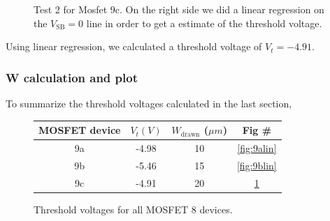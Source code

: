 \documentclass{article}
\begin{document}
\begin{figure}[H]
\centering
{}
\caption{Test 2 for Mosfet 9c. On the right side we did a linear regression on the $V_{\text{SB}} = 0$ line in order to get a estimate of the threshold voltage.}
\label{fig:9clin}
\end{figure}

Using linear regression, we calculated a threshold voltage of $V_t = -4.91$.

\subsubsection{W calculation and plot}
To summarize the threshold voltages calculated in the last section,
\begin{figure}[H]
\centering
\begin{tabular}{c || c | c | c }
MOSFET device & $V_t (V)$ & $W_{\text{drawn}}$ ($\mu m$) & Fig \# \\ \hline
9a & -4.98 & 10 & \textcolor{blue}{\ref{fig:9alin}} \\ \hline
9b & -5.46 & 15 & \textcolor{blue}{\ref{fig:9blin}}\\ \hline
9c & -4.91 & 20 & \textcolor{blue}{\ref{fig:9clin}}\\ \hline
\end{tabular}
\caption{Threshold voltages for all MOSFET 8 devices.}
\label{tab:wdata}
\end{figure}
\end{document}
